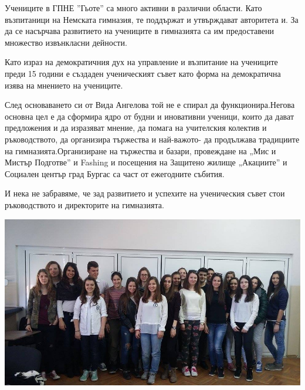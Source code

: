 \begin{multicols}{2}

Учениците в ГПНЕ ”Гьоте” са много активни в различни области. Като възпитаници на Немската гимназия, те поддържат и утвърждават авторитета и. За да се насърчава развитието на учениците в гимназията са им предоставени множество извънкласни дейности.

Като израз на демократичния дух на управление и възпитание на учениците преди 15 години е създаден ученическият съвет като форма на демократична изява на мнението на учениците.

След основаването си от Вида Ангелова той не е спирал да функционира.Негова основна цел е да сформира ядро от будни и иновативни ученици, които да дават предложения и да изразяват мнение,  да помага на учителския колектив и ръководството, да организира тържества и най-важото- да продължава традициите на гимназията.Организиране на тържества и базари, провеждане на „Мис и Мистър Подготве” и Fashing и посещения на Защитено жилище „Акациите” и Социален център град Бургас са част от ежегодните събития.

И нека не забравяме, че зад  развитието и успехите на ученическия съвет стои ръководството и директорите на гимназията.
\end{multicols}

\begin{center}
\includegraphics[width=6.0in]{./US/US.jpg}\\
\end{center}
\closearticle
